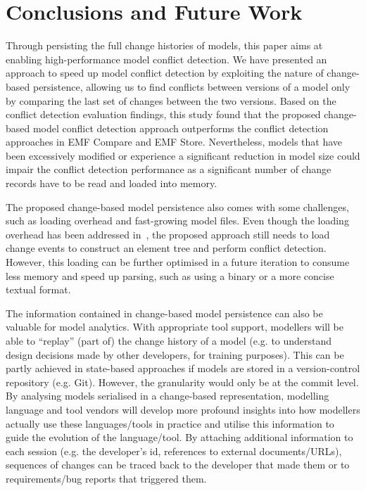 \section{Conclusions and Future Work}
\label{sec:conclusions_and_future_work}
Through persisting the full change histories of models, this paper aims at enabling high-performance model conflict detection. We have presented an approach to speed up model conflict detection by exploiting the nature of change-based persistence, allowing us to find conflicts between versions of a model only by comparing the last set of changes between the two versions. Based on the conflict detection evaluation findings, this study found that the proposed change-based model conflict detection approach outperforms the conflict detection approaches in EMF Compare and EMF Store. Nevertheless, models that have been excessively modified or experience a significant reduction in model size could impair the conflict detection performance as a significant number of change records have to be read and loaded into memory. 

The proposed change-based model persistence also comes with some challenges, such as loading overhead and fast-growing model files. Even though the loading overhead has been addressed in~\cite{DBLP:conf/models/YohannisRPK18}, the proposed approach still needs to load change events to construct an element tree and perform conflict detection. However, this loading can be further optimised in a future iteration to consume less memory and speed up parsing, such as using a binary or a more concise textual format.

The information contained in change-based model persistence can also be valuable for model analytics. With appropriate tool support, modellers will be able to ``replay'' (part of) the change history of a model (e.g. to understand design decisions made by other developers, for training purposes). This can be partly achieved in state-based approaches if models are stored in a version-control repository (e.g. Git). However, the granularity would only be at the commit level. By analysing models serialised in a change-based representation, modelling language and tool vendors will develop more profound insights into how modellers actually use these languages/tools in practice and utilise this information to guide the evolution of the language/tool. By attaching additional information to each session (e.g. the developer's id, references to external documents/URLs), sequences of changes can be traced back to the developer that made them or to requirements/bug reports that triggered them.

